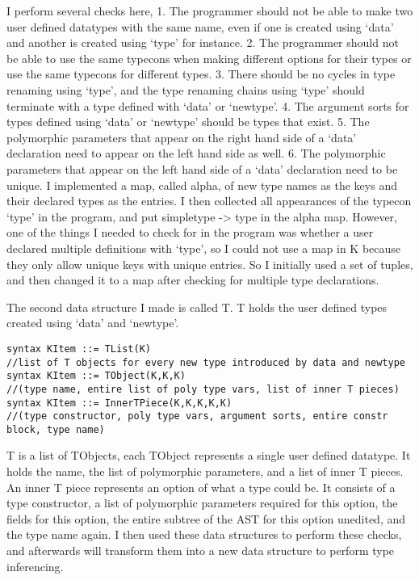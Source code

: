 I perform several checks here, 
1. The programmer should not be able to make two user defined datatypes with the same name, even if one is created using ‘data’ and another is created using ‘type’ for instance.
2. The programmer should not be able to use the same typecons when making different options for their types or use the same typecons for different types.
3. There should be no cycles in type renaming using ‘type’, and the type renaming chains using ‘type’ should terminate with a type defined with ‘data’ or ‘newtype’.
4. The argument sorts for types defined using ‘data’ or ‘newtype’ should be types that exist.
5. The polymorphic parameters that appear on the right hand side of a ‘data’ declaration need to appear on the left hand side as well.
6. The polymorphic parameters that appear on the left hand side of a ‘data’ declaration need to be unique.
I implemented a map, called alpha, of new type names as the keys and their declared types as the entries. I then collected all appearances of the typecon ‘type’ in the program, and put simpletype -> type in the alpha map. However, one of the things I needed to check for in the program was whether a user declared multiple definitions with ‘type’, so I could not use a map in K because they only allow unique keys with unique entries. So I initially used a set of tuples, and then changed it to a map after checking for multiple type declarations.


The second data structure I made is called T. T holds the user defined types created using ‘data’ and ‘newtype’.
\begin{lstlisting}
syntax KItem ::= TList(K) 
//list of T objects for every new type introduced by data and newtype
syntax KItem ::= TObject(K,K,K)
//(type name, entire list of poly type vars, list of inner T pieces)
syntax KItem ::= InnerTPiece(K,K,K,K,K)
//(type constructor, poly type vars, argument sorts, entire constr block, type name)
\end{lstlisting}
T is a list of TObjects, each TObject represents a single user defined datatype. It holds the name, the list of polymorphic parameters, and a list of inner T pieces.
An inner T piece represents an option of what a type could be. It consists of a type constructor, a list of polymorphic parameters required for this option, the fields for this option, the entire subtree of the AST for this option unedited, and the type name again.
I then used these data structures to perform these checks, and afterwards will transform them into a new data structure to perform type inferencing.